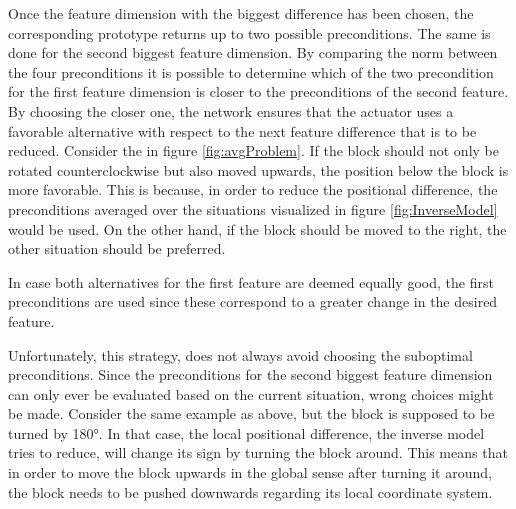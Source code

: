 Once the feature dimension with the biggest difference has been chosen, the corresponding prototype returns up to two possible preconditions. The same is done for the second biggest feature dimension. By comparing the norm between the four preconditions it is possible to determine which of the two precondition for the first feature dimension is closer to the preconditions of the second feature. By choosing the closer one, the network ensures that the actuator uses a favorable alternative with respect to the next feature difference that is to be reduced. Consider the in figure \ref{fig:avgProblem}. If the block should not only be rotated counterclockwise but also moved upwards, the position below the block is more favorable. This is because, in order to reduce the positional difference, the preconditions averaged over the situations visualized in figure \ref{fig:InverseModel} would be used. On the other hand, if the block should be moved to the right, the other situation should be preferred. %

In case both alternatives for the first feature are deemed equally good, the first preconditions are used since these correspond to a greater change in the desired feature.

Unfortunately, this strategy, does not always avoid choosing the suboptimal preconditions. Since the preconditions for the second biggest feature dimension can only ever be evaluated based on the current situation, wrong choices might be made. Consider the same example as above, but the block is supposed to be turned by 180°. In that case, the local positional difference, the inverse model tries to reduce, will change its sign by turning the block around. This means that in order to move the block upwards in the global sense after turning it around, the block needs to be pushed downwards regarding its local coordinate system. %


